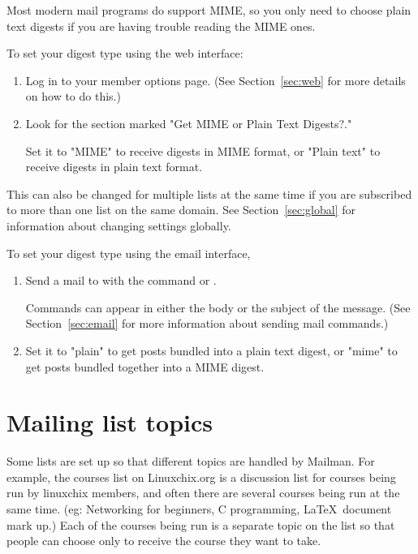 \documentclass{howto}
\begin{document}
Most modern mail programs do support MIME, so you only need to choose 
plain text digests if you are having trouble reading the MIME ones.


To set your digest type using the web interface:
\begin{enumerate}
   \item Log in to your member options page.  (See Section~\ref{sec:web}
   for more details on how to do this.)
   \item Look for the section marked "Get MIME or Plain Text Digests?."

	Set it to "MIME" to receive digests in MIME format, or "Plain text" to 
	receive digests in plain text format. 
\end{enumerate}

This can also be changed for multiple lists at the same time if you are subscribed to 
more than one list on the same domain.  See Section~\ref{sec:global} for 
information about changing settings globally.

To set your digest type using the email interface,
\begin{enumerate}
   \item Send a mail to  with the command
    or .

   Commands can appear
   in either the body or the subject of the message.  (See
   Section~\ref{sec:email} for more information about sending mail
   commands.)
   \item Set it to "plain" to get posts bundled into a plain text digest,
	or "mime" to get posts bundled together into a MIME digest.
\end{enumerate}

\section{Mailing list topics\label{sec:topics}}

Some lists are set up so that different topics are handled by Mailman.
For example, the courses list on Linuxchix.org is a discussion list for
courses being run by linuxchix members, and often there are several courses
being run at the same time.  
(eg: Networking for beginners, C programming, \LaTeX ~document mark up.)  
Each of the courses being run is a separate topic on the list so that people
can choose only to receive the course they want to take.
\end{document}
